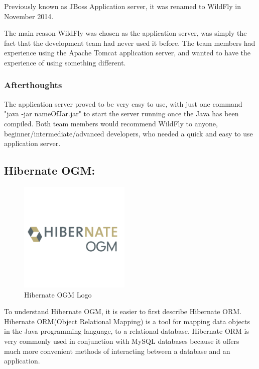 Previously known as JBoss Application server, it was renamed to WildFly in November 2014. 

\bigskip

The main reason WildFly was chosen as the application server, was simply the fact that the development team had never used it before. The team members had experience using the Apache Tomcat application server, and wanted to have the experience of using something different.

\subsubsection{Afterthoughts}
The application server proved to be very easy to use, with just one command "java -jar nameOfJar.jar" to start the server running once the Java has been compiled. Both team members would recommend WildFly to anyone, beginner/intermediate/advanced developers, who needed a quick and easy to use application server.



\subsection{Hibernate OGM:}
\label{sec:TechnologyReviewHibernate}
\begin{figure}[H]
    \centering
    \includegraphics[width=\textwidth, height=150pt]{img/HibernateOGMLogo.png}
    \caption{Hibernate OGM Logo}
    \label{fig:my_label}
\end{figure}
To understand Hibernate OGM, it is easier to first describe Hibernate ORM. Hibernate ORM(Object Relational Mapping) is a tool for mapping data objects in the Java programming language, to a relational database. Hibernate ORM is very commonly used in conjunction with MySQL databases because it offers much more convenient methods of interacting between a database and an application. 

